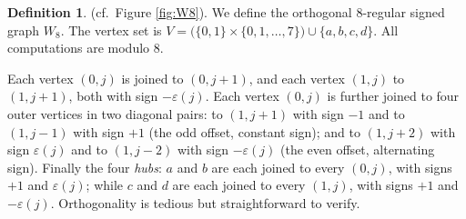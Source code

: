 \documentclass[11pt]{article}
\theoremstyle{plain}
\newcommand{\eps}{\varepsilon}
\theoremstyle{definition}
\newtheorem{definition}[theorem]{Definition}
\begin{document}
\begin{definition}\label{defH8} (cf.~Figure \ref{fig:W8}).
We define the orthogonal $8$-regular signed graph $W_8$.  The vertex set is
$V=\bigl(\{0,1\}\times\{0,1,\dots,7\}\bigr)\cup\{a,b,c,d\}$.  All computations
are modulo $8$.

Each vertex $(0,j)$ is joined to $(0,j+1)$, and each vertex $(1,j)$ to
$(1,j+1)$, both with sign $-\eps(j)$.  Each vertex $(0,j)$ is further joined to
four outer vertices in two diagonal pairs: to $(1,j+1)$ with sign $-1$ and to
$(1,j-1)$ with sign $+1$ (the odd offset, constant sign); and to $(1,j+2)$ with
sign $\eps(j)$ and to $(1,j-2)$ with sign $-\eps(j)$ (the even offset,
alternating sign).  Finally the four \emph{hubs}: $a$ and $b$ are each joined
to every $(0,j)$, with signs $+1$ and $\eps(j)$; while $c$ and $d$ are each
joined to every $(1,j)$, with signs $+1$ and $-\eps(j)$. Orthogonality is tedious but straightforward to verify.
\end{definition}
\end{document}
